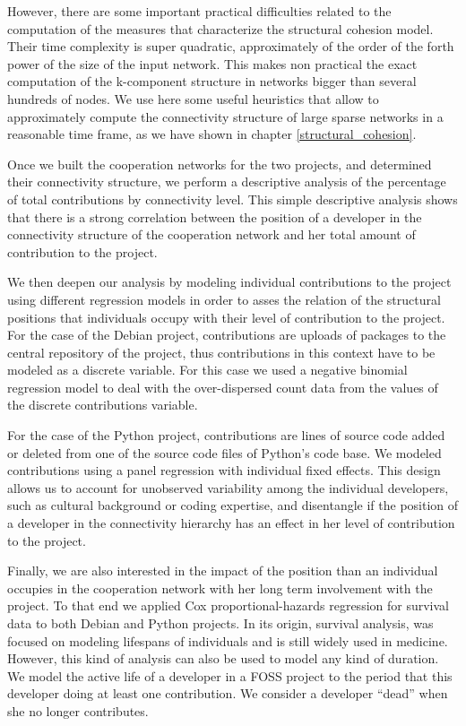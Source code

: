 However, there are some important practical difficulties related to the computation of the measures that characterize the structural cohesion model. Their time complexity is super quadratic, approximately of the order of the forth power of the size of the input network. This makes non practical the exact computation of the k-component structure in networks bigger than several hundreds of nodes. We use here some useful heuristics that allow to approximately compute the connectivity structure of large sparse networks in a reasonable time frame, as we have shown in chapter \ref{structural_cohesion}.

Once we built the cooperation networks for the two projects, and determined their connectivity structure, we perform a descriptive analysis of the percentage of total contributions by connectivity level. This simple descriptive analysis shows that there is a strong correlation between the position of a developer in the connectivity structure of the cooperation network and her total amount of contribution to the project.

We then deepen our analysis by modeling individual contributions to the project using different regression models in order to asses the relation of the structural positions that individuals occupy with their level of contribution to the project. For the case of the Debian project, contributions are uploads of packages to the central repository of the project, thus contributions in this context have to be modeled as a discrete variable. For this case we used a negative binomial regression model to deal with the over-dispersed count data from the values of the discrete contributions variable.

For the case of the Python project, contributions are lines of source code added or deleted from one of the source code files of Python's code base. We modeled contributions using a panel regression with individual fixed effects. This design allows us to account for unobserved variability among the individual developers, such as cultural background or coding expertise, and disentangle if the position of a developer in the connectivity hierarchy has an effect in her level of contribution to the project.

Finally, we are also interested in the impact of the position than an individual occupies in the cooperation network with her long term involvement with the project. To that end we applied Cox proportional-hazards regression for survival data to both Debian and Python projects. In its origin, survival analysis, was focused on modeling lifespans of individuals and is still widely used in medicine. However, this kind of analysis can also be used to model any kind of duration. We model the active life of a developer in a FOSS project to the period that this developer doing at least one contribution. We consider a developer ``dead'' when she no longer contributes.


